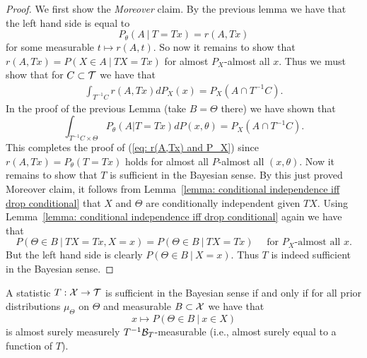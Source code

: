 \documentclass[twoside, a4paper, 10pt]{amsart}
\begin{document}
\begin{proof} We first show the \textit{Moreover} claim. By the previous lemma we have that the left hand side is equal to $$P_{\theta}(A ~|~ T=Tx) = r(A,Tx)$$ for some measurable $t \mapsto r(A,t)$. So now it remains to show that $r(A,Tx) = P(X \in A ~|~ TX=Tx)$ for almost $P_X$-almost all $x$. Thus we must show that for $C \subset \mathcal{T}$ we have that \begin{align}\label{eq: r(A,Tx) and P_X} \int_{T^{-1}C} r(A,Tx) dP_X(x) = P_X(A \cap T^{-1}C).\end{align} In the proof of the previous Lemma (take $B=\Theta$ there) we have shown that $$\int_{T^{-1}C \times \Theta} P_{\theta}(A | T=Tx) dP(x,\theta) = P_X(A \cap T^{-1}C). $$ This completes the proof of (\ref{eq: r(A,Tx) and P_X}) since $r(A,Tx) = P_{\theta}(T=Tx)$ holds for almost all $P$-almost all $(x,\theta)$. Now it remains to show that $T$ is sufficient in the Bayesian sense. By this just proved Moreover claim, it follows from Lemma~\ref{lemma: conditional independence iff drop conditional}  that $X$ and $\Theta$ are conditionally independent given $TX$. Using Lemma~\ref{lemma: conditional independence iff drop conditional} again we have that $$P(\Theta \in B ~|~ TX=Tx, X = x) = P(\Theta \in B ~|~ TX=Tx) \quad\text{ for $P_X$-almost all $x$}.$$ But the left hand side is clearly $P(\Theta \in B ~|~ X=x)$. Thus $T$ is indeed sufficient in the Bayesian sense. \end{proof}


\begin{lemma} A statistic $T:\mathcal{X} \to \mathcal{T}$ is sufficient in the Bayesian sense if and only if for all prior distributions $\mu_{\Theta}$ on $\Theta$ and measurable $B \subset \mathcal{X}$ we have that $$x \mapsto P(\Theta \in B ~|~ x \in X)$$ is almost surely measurely $T^{-1}\mathcal{B}_T$-measurable (i.e., almost surely equal to a function of $T$).

\end{lemma}
\end{document}
